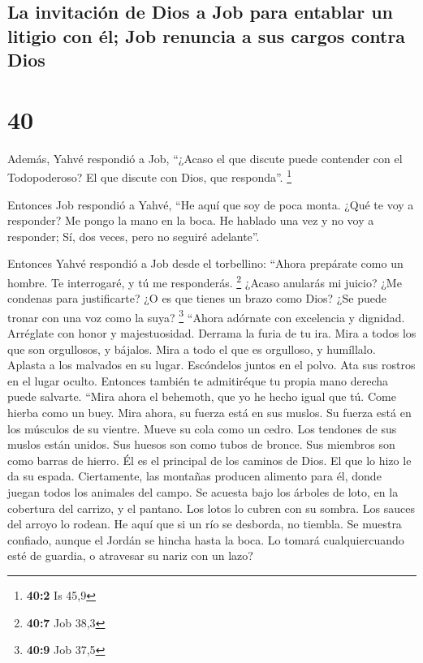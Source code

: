 \hypertarget{la-invitaciuxf3n-de-dios-a-job-para-entablar-un-litigio-con-uxe9l-job-renuncia-a-sus-cargos-contra-dios}{%
\subsection{La invitación de Dios a Job para entablar un litigio con él;
Job renuncia a sus cargos contra
Dios}\label{la-invitaciuxf3n-de-dios-a-job-para-entablar-un-litigio-con-uxe9l-job-renuncia-a-sus-cargos-contra-dios}}

\hypertarget{section-39}{%
\section{40}\label{section-39}}

 Además, Yahvé respondió a Job,  ``¿Acaso el
que discute puede contender con el Todopoderoso? El que discute con
Dios, que responda''. \footnote{\textbf{40:2} Is 45,9}

 Entonces Job respondió a Yahvé,  ``He aquí
que soy de poca monta. ¿Qué te voy a responder? Me pongo la mano en la
boca.  He hablado una vez y no voy a responder; Sí, dos
veces, pero no seguiré adelante''.

 Entonces Yahvé respondió a Job desde el torbellino:
 ``Ahora prepárate como un hombre. Te interrogaré, y tú me
responderás. \footnote{\textbf{40:7} Job 38,3}  ¿Acaso
anularás mi juicio? ¿Me condenas para justificarte?  ¿O es
que tienes un brazo como Dios? ¿Se puede tronar con una voz como la
suya? \footnote{\textbf{40:9} Job 37,5}  ``Ahora adórnate
con excelencia y dignidad. Arréglate con honor y majestuosidad.
 Derrama la furia de tu ira. Mira a todos los que son
orgullosos, y bájalos.  Mira a todo el que es orgulloso,
y humíllalo. Aplasta a los malvados en su lugar. 
Escóndelos juntos en el polvo. Ata sus rostros en el lugar oculto.
 Entonces también te admitiréque tu propia mano derecha
puede salvarte.  ``Mira ahora el behemoth, que yo he
hecho igual que tú. Come hierba como un buey.  Mira
ahora, su fuerza está en sus muslos. Su fuerza está en los músculos de
su vientre.  Mueve su cola como un cedro. Los tendones de
sus muslos están unidos.  Sus huesos son como tubos de
bronce. Sus miembros son como barras de hierro.  Él es el
principal de los caminos de Dios. El que lo hizo le da su espada.
 Ciertamente, las montañas producen alimento para él,
donde juegan todos los animales del campo.  Se acuesta
bajo los árboles de loto, en la cobertura del carrizo, y el pantano.
 Los lotos lo cubren con su sombra. Los sauces del arroyo
lo rodean.  He aquí que si un río se desborda, no
tiembla. Se muestra confiado, aunque el Jordán se hincha hasta la boca.
 Lo tomará cualquiercuando esté de guardia, o atravesar
su nariz con un lazo?

